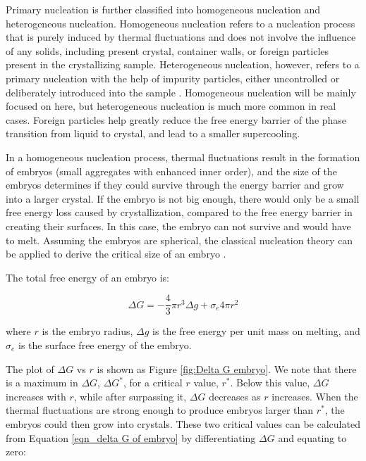 Primary nucleation is further classified into homogeneous nucleation and heterogeneous nucleation. Homogeneous nucleation refers to a nucleation process that is purely induced by thermal fluctuations and does not involve the influence of any solids, including present crystal, container walls, or foreign particles present in the crystallizing sample. Heterogeneous nucleation, however, refers to a primary nucleation with the help of impurity particles, either uncontrolled or deliberately introduced into the sample \cite{Strobl2007a}. Homogeneous nucleation will be mainly focused on here, but heterogeneous nucleation is much more common in real cases. Foreign particles help greatly reduce the free energy barrier of the phase transition from liquid to crystal, and lead to a smaller supercooling.

In a homogeneous nucleation process, thermal fluctuations result in the formation of embryos (small aggregates with enhanced inner order), and the size of the embryos determines if they could survive through the energy barrier and grow into a larger crystal. If the embryo is not big enough, there would only be a small free energy loss caused by crystallization, compared to the free energy barrier in creating their surfaces. In this case, the embryo can not survive and would have to melt. Assuming the embryos are spherical, the classical nucleation theory can be applied to derive the critical size of an embryo \cite{Chai2016}.

The total free energy of an embryo is:

\begin{equation}
\label{eqn_delta G of embryo}
\Delta G = -\dfrac{4}{3} \pi r^{3} \Delta g + \sigma_{e} 4 \pi r^{2}
\end{equation}

\noindent
where $r$ is the embryo radius, $\Delta g$ is the free energy per unit mass on melting, and $\sigma_{e}$ is the surface free energy of the embryo.

The plot of $\Delta G$ vs $r$ is shown as Figure \ref{fig:Delta G embryo}. We note that there is a maximum in  $\Delta G$, $\Delta G^{*}$, for a critical $r$ value, $r^{*}$. Below this value, $\Delta G$ increases with $r$, while after surpassing it, $\Delta G$ decreases as $r$ increases. When the thermal fluctuations are strong enough to produce embryos larger than $r^{*}$, the embryos could then grow into crystals. These two critical values can be calculated \cite{Hoffman1997} from Equation \ref{eqn_delta G of embryo} by differentiating $\Delta G$ and equating to zero:

